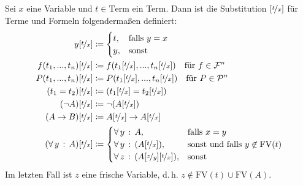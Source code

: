 \documentclass{cheat-sheet}
\newcommand{\Term}{\mathrm{Term}} %
\newcommand{\FV}{\mathrm{FV}} %
\newcommand{\subst}[2]{\nicefrac{#1}{#2}} %
\begin{document}
\begin{prop}
  \begin{minipage}{0.72 \linewidth}
    \begin{itemize}
    \end{itemize}
  \end{minipage}
\end{prop}

\begin{defn}
  Sei $x$ eine Variable und $t \in \Term$ ein Term. Dann ist die Substitution $[\subst{t}{x}]$ für Terme und Formeln folgendermaßen definiert:
  \begin{alignat*}{2}
    y[\subst{t}{x}] & \coloneqq \begin{cases}
      t, & \text{falls } y = x \\
      y, & \text{sonst}
    \end{cases} \\
    f(t_1, ..., t_n)[\subst{t}{x}] & \coloneqq f(t_1[\subst{t}{x}], ..., t_n[\subst{t}{x}]) \quad \text{für $f \in \mathcal{F}^n$} \\
    P(t_1, ..., t_n)[\subst{t}{x}] & \coloneqq P(t_1[\subst{t}{x}], ..., t_n[\subst{t}{x}]) \quad \text{für $P \in \mathcal{P}^n$} \\
    (t_1 = t_2)[\subst{t}{x}] & \coloneqq (t_1[\subst{t}{x}] = t_2[\subst{t}{x}]) \\
    (\neg A)[\subst{t}{x}] & \coloneqq \neg (A[\subst{t}{x}]) \\
    (A \to B)[\subst{t}{x}] & \coloneqq A[\subst{t}{x}] \to A[\subst{t}{x}] \\
    (\fa{y} A)[\subst{t}{x}] & \coloneqq \begin{cases}
      \fa{y} A, & \text{falls $x = y$} \\
      \fa{y} (A[\subst{t}{x}]), & \text{sonst und falls $y \not\in \FV(t)$} \\
      \fa{z} (A[\subst{z}{y}][\subst{t}{x}]), & \text{sonst}
    \end{cases}
  \end{alignat*}
  Im letzten Fall ist $z$ eine frische Variable, d.\,h. $z \not\in \FV(t) \cup \FV(A)$.
\end{defn}

\end{document}
